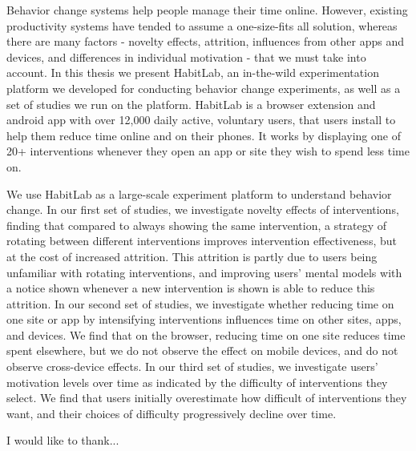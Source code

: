 \beforepreface
{}

Behavior change systems help people manage their time online. However, existing productivity systems have tended to assume a one-size-fits all solution, whereas there are many factors - novelty effects, attrition, influences from other apps and devices, and differences in individual motivation - that we must take into account. In this thesis we present HabitLab, an in-the-wild experimentation platform we developed for conducting behavior change experiments, as well as a set of studies we run on the platform. HabitLab is a browser extension and android app with over 12,000 daily active, voluntary users, that users install to help them reduce time online and on their phones. It works by displaying one of 20+ interventions whenever they open an app or site they wish to spend less time on.

We use HabitLab as a large-scale experiment platform to understand behavior change. In our first set of studies, we investigate novelty effects of interventions, finding that compared to always showing the same intervention, a strategy of rotating between different interventions improves intervention effectiveness, but at the cost of increased attrition. This attrition is partly due to users being unfamiliar with rotating interventions, and improving users' mental models with a notice shown whenever a new intervention is shown is able to reduce this attrition. In our second set of studies, we investigate whether reducing time on one site or app by intensifying interventions influences time on other sites, apps, and devices. We find that on the browser, reducing time on one site reduces time spent elsewhere, but we do not observe the effect on mobile devices, and do not observe cross-device effects. In our third set of studies, we investigate users' motivation levels over time as indicated by the difficulty of interventions they select. We find that users initially overestimate how difficult of interventions they want, and their choices of difficulty progressively decline over time.

I would like to thank...
\afterpreface